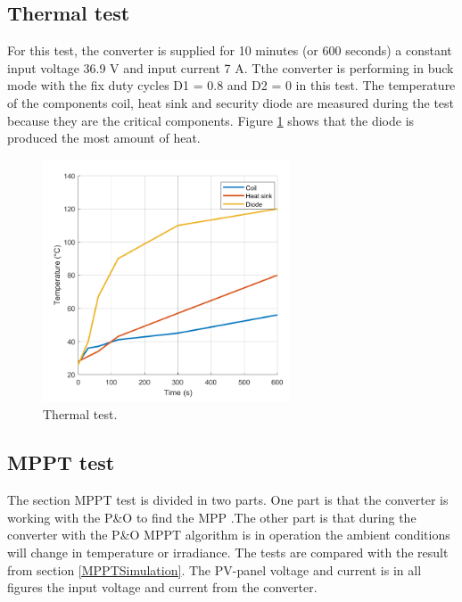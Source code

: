 \subsection{Thermal test}

For this test, the converter is supplied for 10 minutes (or 600 seconds) a constant input voltage 36.9 V and input current 7 A. Tthe converter is performing in buck mode with the fix duty cycles D1 = 0.8 and D2 = 0 in this test. The temperature of the components coil, heat sink and security diode are measured during the test because they are the critical components. Figure \ref{Testthermal} shows that the diode is produced the most amount of heat.

\begin{figure}[H]
	\begin{center}
		\includegraphics[width=0.65\textwidth]{../Pictures/P1/Test/Thermal_test_with_heat_sink}
		\caption{Thermal test.}
		\label{Testthermal}
	\end{center}	
\end{figure}

\subsection{MPPT test}
The section MPPT test is divided in two parts. One part is that the converter is working with the P\&O to find the MPP .The other part is that during the converter with the P\&O MPPT algorithm is in operation the ambient conditions will change in temperature or irradiance. The tests are compared with the result from section \ref{MPPTSimulation}. The PV-panel voltage and current is in all figures the input voltage and current from the converter.


